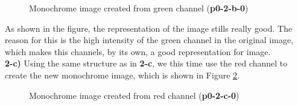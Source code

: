 \documentclass[12pt,a4paper]{article}
\begin{document}
\begin{figure}[!h]
	\centering
	{%
		\setlength{\fboxsep}{1pt}%
		\setlength{\fboxrule}{1pt}%
	}%
	\caption{Monochrome image created from green channel (\textbf{p0-2-b-0})}
	\label{fig:img-green}
\end{figure}

As shown in the figure, the representation of the image stills really good. The reason for this is the high intensity of the green channel in the original image, which makes this channels, by its own, a good representation for image.\\

\textbf{2-c) } Using the same structure as in \textbf{2-c}, we this time use the red channel to create the new monochrome image, which is shown in Figure \ref{fig:img-red}.

\begin{figure}[!h]
	\centering
	{%
		\setlength{\fboxsep}{1pt}%
		\setlength{\fboxrule}{1pt}%
	}%
	\caption{Monochrome image created from red channel (\textbf{p0-2-c-0})}
	\label{fig:img-red}
\end{figure}
\end{document}

